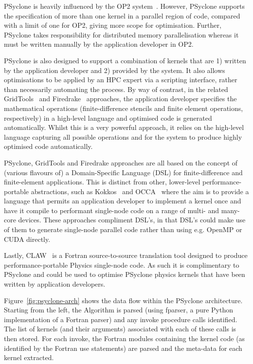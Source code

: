 \documentclass[review,times]{elsarticle}
\begin{document}
PSyclone is heavily influenced by the OP2 system~\citep{OP2,
  PYOP2}. However, PSyclone supports the specification of more than
one kernel in a parallel region of code, compared with a limit of one
for OP2, giving more scope for optimisation. Further, PSyclone takes
responsibility for distributed memory parallelisation whereas it must be
written manually by the application developer in OP2.

PSyclone is also designed to support a combination of kernels that are
1) written by the application developer and 2) provided by the
system. It also allows optimisations to be applied by an HPC expert
via a scripting interface, rather than necessarily automating the
process. By way of contrast, in the related
GridTools~\citep{grid_tools} and Firedrake~\citep{firedrake,fenics}
approaches, the application developer specifies the mathematical
operations (finite-difference stencils and finite element operations,
respectively) in a high-level language and optimised code is generated
automatically. Whilst this is a very powerful approach, it relies on
the high-level language capturing all possible operations and for the
system to produce highly optimised code automatically.

PSyclone, GridTools and Firedrake approaches are all based on the
concept of (various flavours of) a Domain-Specific Language (DSL) for
finite-difference and finite-element applications. This is distinct
from other, lower-level performance-portable abstractions, such as
Kokkos~\cite{KokkosGitHub} and OCCA~\citep{occa} where the aim is to
provide a language that permits an application developer to implement
a kernel once and have it compile to performant single-node code on a
range of multi- and many-core devices. These approaches compliment
DSL's, in that DSL's could make use of them to generate single-node
parallel code rather than using e.g. OpenMP or CUDA directly.

Lastly, CLAW~\citep{claw} is a Fortran source-to-source translation
tool designed to produce performance-portable Physics single-node
code. As such it is complimentary to PSyclone and could be used to
optimise PSyclone physics kernels that have been written by
application developers.

Figure~\ref{fig:psyclone-arch} shows the data flow within the PSyclone
architecture. Starting from the left, the Algorithm is parsed (using
fparser, a pure Python implementation of a Fortran parser) and any
invoke procedure calls identified. The list of kernels (and their arguments)
associated with each of these calls is then stored. For each invoke,
the Fortran modules containing the kernel code (as identified by
the Fortran use statements) are parsed and the meta-data for each kernel
extracted.
\end{document}
